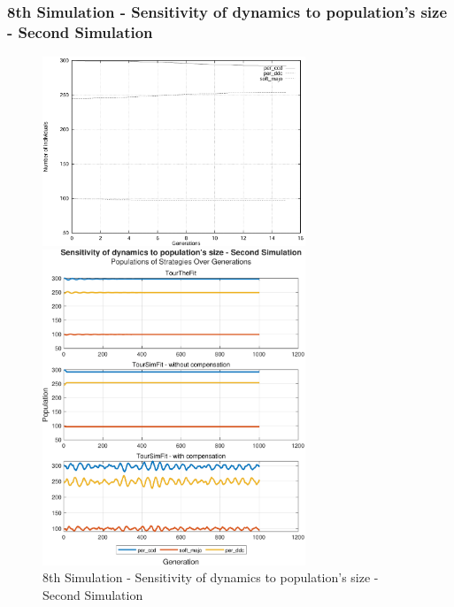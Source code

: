 \documentclass[12pt]{article}
\begin{document}
\subsubsection{8th Simulation - Sensitivity of dynamics to population's size - Second Simulation}
	\begin{figure}[h]
	    \centering
		\includegraphics[width=0.7\textwidth]{RefPaperFigures/fig7b.jpeg}\par\vspace{0.5em}
	    \includegraphics[width=0.7\textwidth]{Sensitivity of dynamics to population's size - Second Simulation.pdf}
	    \caption{8th Simulation - Sensitivity of dynamics to population's size - Second Simulation}
	    \label{fig:Monotonous Convergence}
	\end{figure}
\end{document}
